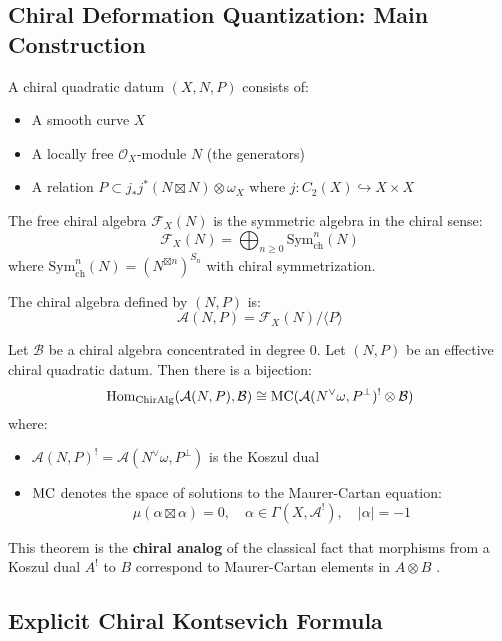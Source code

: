 \subsection{Chiral Deformation Quantization: Main Construction}

\begin{definition}
\label{def:chiral-quadratic}
A chiral quadratic datum $(X, N, P)$ consists of:
\begin{itemize}
\item A smooth curve $X$
\item A locally free $\mathcal{O}_X$-module $N$ (the generators)
\item A relation $P \subset j_*j^*(N \boxtimes N) \otimes \omega_X$ where $j: C_2(X) \hookrightarrow X \times X$
\end{itemize}

The free chiral algebra $\mathcal{F}_X(N)$ is the symmetric algebra in the chiral sense:
$$\mathcal{F}_X(N) = \bigoplus_{n \geq 0} \text{Sym}^n_{\text{ch}}(N)$$
where $\text{Sym}^n_{\text{ch}}(N) = (N^{\boxtimes n})^{S_n}$ with chiral symmetrization.

The chiral algebra defined by $(N,P)$ is:
$$\mathcal{A}(N,P) = \mathcal{F}_X(N) / \langle P \rangle$$
\end{definition}

\begin{theorem}
\label{thm:GLZ-koszul}
Let $\mathcal{B}$ be a chiral algebra concentrated in degree 0. Let $(N, P)$ be an effective chiral quadratic datum. Then there is a bijection:
$$\text{Hom}_{\text{ChirAlg}}(\mathcal{A}(N,P), \mathcal{B}) \cong \text{MC}(\mathcal{A}(N^{\vee}\omega, P^{\perp})^! \otimes \mathcal{B})$$
where:
\begin{itemize}
\item $\mathcal{A}(N,P)^! = \mathcal{A}(N^{\vee}\omega, P^{\perp})$ is the Koszul dual
\item $\text{MC}$ denotes the space of solutions to the Maurer-Cartan equation:
   $$\mu(\alpha \boxtimes \alpha) = 0, \quad \alpha \in \Gamma(X, \mathcal{A}^!), \quad |\alpha| = -1$$
\end{itemize}
\end{theorem}

This theorem is the \textbf{chiral analog} of the classical fact that morphisms from a Koszul dual $A^!$ to $B$ correspond to Maurer-Cartan elements in $A \otimes B$ \cite{LV}.

\subsection{Explicit Chiral Kontsevich Formula}

